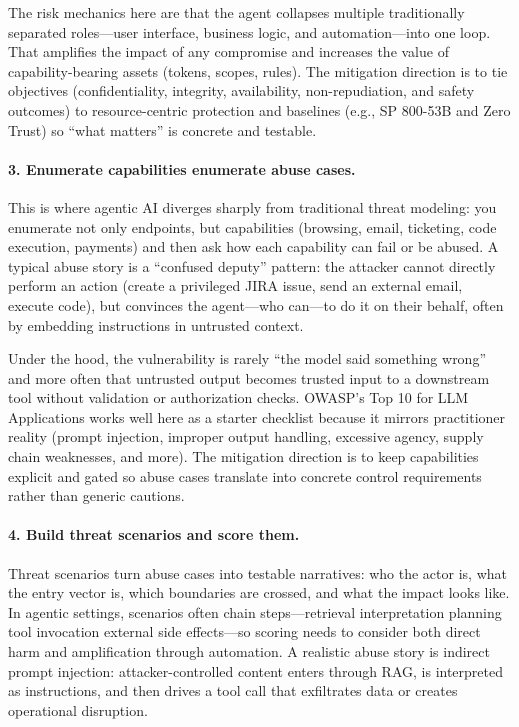 \begin{TNtwocol}
  The risk mechanics here are that the agent collapses multiple traditionally separated roles—user interface, business logic, and automation—into one loop. That amplifies the impact of any compromise and increases the value of capability-bearing assets (tokens, scopes, rules). The mitigation direction is to tie objectives (confidentiality, integrity, availability, non-repudiation, and safety outcomes) to resource-centric protection and baselines (e.g., SP 800-53B and Zero Trust) so “what matters” is concrete and testable. \cite{nist-sp800-53b,nist-sp800-207}

  \paragraph{3. Enumerate capabilities \rightarrow enumerate abuse cases.}
  This is where agentic AI diverges sharply from traditional threat modeling: you enumerate not only endpoints, but capabilities (browsing, email, ticketing, code execution, payments) and then ask how each capability can fail or be abused. A typical abuse story is a “confused deputy” pattern: the attacker cannot directly perform an action (create a privileged JIRA issue, send an external email, execute code), but convinces the agent—who can—to do it on their behalf, often by embedding instructions in untrusted context.

  Under the hood, the vulnerability is rarely “the model said something wrong” and more often that untrusted output becomes trusted input to a downstream tool without validation or authorization checks. OWASP's Top 10 for LLM Applications works well here as a starter checklist because it mirrors practitioner reality (prompt injection, improper output handling, excessive agency, supply chain weaknesses, and more). The mitigation direction is to keep capabilities explicit and gated so abuse cases translate into concrete control requirements rather than generic cautions. \cite{owasp-top10-llm-2025,owasp-prompt-injection-cheatsheet}

  \paragraph{4. Build threat scenarios and score them.}
  Threat scenarios turn abuse cases into testable narratives: who the actor is, what the entry vector is, which boundaries are crossed, and what the impact looks like. In agentic settings, scenarios often chain steps—retrieval \rightarrow interpretation \rightarrow planning \rightarrow tool invocation \rightarrow external side effects—so scoring needs to consider both direct harm and amplification through automation. A realistic abuse story is indirect prompt injection: attacker-controlled content enters through RAG, is interpreted as instructions, and then drives a tool call that exfiltrates data or creates operational disruption.


\end{TNtwocol}
